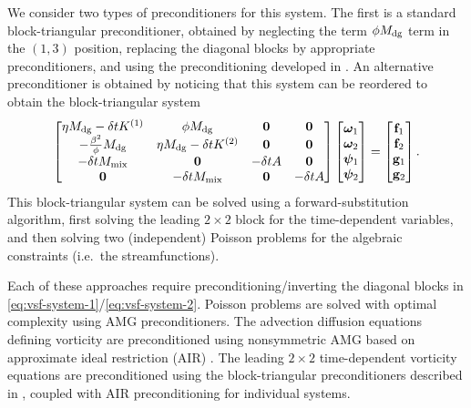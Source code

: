 \documentclass[review]{siamart}
\begin{document}
We consider two types of preconditioners for this system.
The first is a standard block-triangular preconditioner, obtained by neglecting the term $\phi M_{\rm dg}$ term in the $(1,3)$ position, replacing the diagonal blocks by appropriate preconditioners, and using the preconditioning developed in .
An alternative preconditioner is obtained by noticing that this system can be reordered to obtain the block-triangular system
\begin{align} \label{eq:vsf-system-2}
	\begin{bmatrix}
		\eta M_{\rm dg} - \delta t K^{(1)} & \phi M_{\rm dg} & \mathbf{0} & \mathbf{0} \\
		-\tfrac{\beta^2}{\phi}M_{\rm dg} & \eta M_{\rm dg} - \delta t K^{(2)}  & \mathbf{0}& \mathbf{0} \\
		-\delta t M_{\rm mix} & \mathbf{0} & -\delta t A & \mathbf{0} \\
		\mathbf{0} & -\delta t M_{\rm mix} & \mathbf{0} & -\delta t A
	\end{bmatrix}
	\begin{bmatrix} \bm\omega_1 \\ \bm\omega_2 \\ \bm\psi_1 \\ \bm\psi_2 \end{bmatrix}
	=
	\begin{bmatrix} \mathbf{f}_1 \\ \mathbf{f}_2 \\ \mathbf{g}_1 \\ \mathbf{g}_2 \end{bmatrix}.
\end{align}
This block-triangular system can be solved using a forward-substitution algorithm, first solving the leading $2\times2$ block for the time-dependent variables, and then solving two (independent) Poisson problems for the algebraic constraints (i.e.\ the streamfunctions).

Each of these approaches require preconditioning/inverting the diagonal blocks in
\eqref{eq:vsf-system-1}/\eqref{eq:vsf-system-2}. Poisson problems are solved with optimal complexity using AMG preconditioners. The advection diffusion equations defining vorticity are preconditioned using nonsymmetric AMG based on approximate ideal restriction (AIR) \cite{Manteuffel:2019,Manteuffel:2018}.
The leading $2\times 2$ time-dependent vorticity equations are preconditioned using the block-triangular preconditioners described in , coupled with AIR preconditioning for individual systems.
\end{document}
